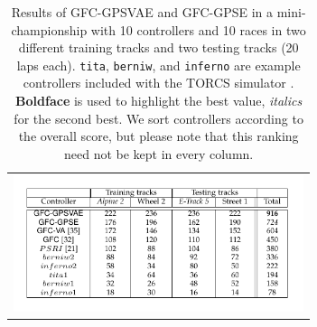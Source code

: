\documentclass[10pt,journal,compsoc]{IEEEtran}
\begin{document}
\begin{table}[ht]
  \centering
  {\scriptsize
    \caption{\scriptsize Results of {\sf GFC-GPSVAE} and {\sf GFC-GPSE}
      in a mini-championship with 10 controllers
      and 10 races in two different training tracks and two testing tracks (20 laps each). {\tt tita}, {\tt berniw}, and {\tt inferno} are example controllers included with the TORCS
      simulator \cite{torcs4}.  {\bf Boldface} is used to highlight
      the best value, {\em italics} for the second
      best. We sort controllers according to the
        overall score, but please note that this ranking need not be
        kept in every column.}
    {
    							\begin{tabular}{c}
    		\includegraphics[width=8.5cm, height=4cm, clip=true, trim=0cm 0cm 0cm 0cm]{fig/table4.pdf} 
%    		
%
%
%
%
%
\end{tabular}
}\label{tab:allsresults}
}
\end{table}
\end{document}
